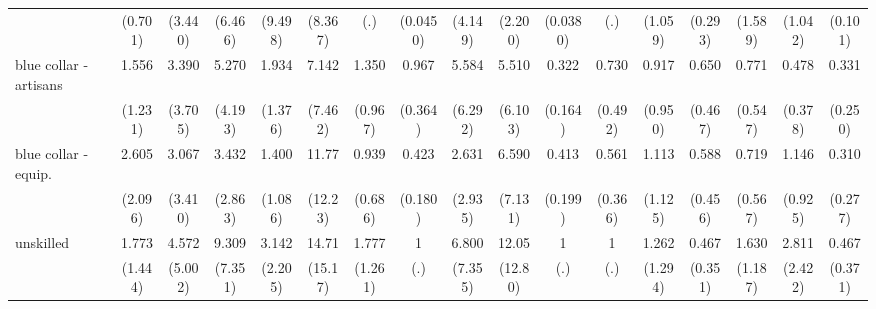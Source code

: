 {\begin{tabular}{l*{16}{c}}
                    &     (0.701)         &     (3.440)         &     (6.466)         &     (9.498)         &     (8.367)         &         (.)         &    (0.0450)         &     (4.149)         &     (2.200)         &    (0.0380)         &         (.)         &     (1.059)         &     (0.293)         &     (1.589)         &     (1.042)         &     (0.101)         \\
[1em]
blue collar - artisans&       1.556         &       3.390         &       5.270\sym{*}  &       1.934         &       7.142         &       1.350         &       0.967         &       5.584         &       5.510         &       0.322\sym{*}  &       0.730         &       0.917         &       0.650         &       0.771         &       0.478         &       0.331         \\
                    &     (1.231)         &     (3.705)         &     (4.193)         &     (1.376)         &     (7.462)         &     (0.967)         &     (0.364)         &     (6.292)         &     (6.103)         &     (0.164)         &     (0.492)         &     (0.950)         &     (0.467)         &     (0.547)         &     (0.378)         &     (0.250)         \\
[1em]
blue collar - equip.&       2.605         &       3.067         &       3.432         &       1.400         &       11.77\sym{*}  &       0.939         &       0.423\sym{*}  &       2.631         &       6.590         &       0.413         &       0.561         &       1.113         &       0.588         &       0.719         &       1.146         &       0.310         \\
                    &     (2.096)         &     (3.410)         &     (2.863)         &     (1.086)         &     (12.23)         &     (0.686)         &     (0.180)         &     (2.935)         &     (7.131)         &     (0.199)         &     (0.366)         &     (1.125)         &     (0.456)         &     (0.567)         &     (0.925)         &     (0.277)         \\
[1em]
unskilled           &       1.773         &       4.572         &       9.309\sym{**} &       3.142         &       14.71\sym{**} &       1.777         &           1         &       6.800         &       12.05\sym{*}  &           1         &           1         &       1.262         &       0.467         &       1.630         &       2.811         &       0.467         \\
                    &     (1.444)         &     (5.002)         &     (7.351)         &     (2.205)         &     (15.17)         &     (1.261)         &         (.)         &     (7.355)         &     (12.80)         &         (.)         &         (.)         &     (1.294)         &     (0.351)         &     (1.187)         &     (2.422)         &     (0.371)         \\

\end{tabular}}
